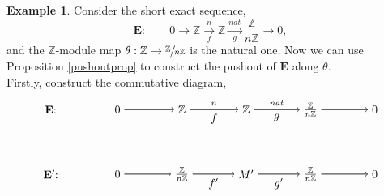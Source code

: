 \documentclass[11.5pt, twoside, a4paper, titlepage]{report}
\providecommand{\bb}[1]{\mathbb{#1}}
\theoremstyle{definition}
\newtheorem{eg}[mydef]{Example}
\theoremstyle{plain}
\begin{document}
\begin{eg}
Consider the short exact sequence,
\begin{equation*}
\mathbf{E}: \qquad 0\xrightarrow{} \bb{Z} \xrightarrow[f]{n} \bb{Z}\xrightarrow[g]{nat}\frac{\bb{Z}}{n\bb{Z}} \xrightarrow{} 0,
\end{equation*}
and the $\bb{Z}$-module map $\theta: \bb{Z} \to \sfrac{\bb{Z}}{n\bb{Z}}$ is the natural one. Now we can use Proposition \ref{pushoutprop} to construct the pushout of $\mathbf{E}$ along $\theta$.\\
Firstly, construct the commutative diagram,
\begin{equation*}
\begin{tikzpicture}[->,-latex, auto, main path/.style={->, semithick}, main node/.style={}]
\node	[main node]		(1) at (0,0)		{$\mathbf{E}$: \quad };
\node	[main node]		(2) at (2,0)		{$0$};
\node	[main node]		(3) at (4,0)		{$\bb{Z}$};
\node [main node]		(4) at (6,0)		{$\bb{Z}$};
\node [main node]		(5) at (8,0)		{$\frac{\bb{Z}}{n\bb{Z}}$};
\node	[main node]		(11) at (10,0)	{$0$};

\node	[main node]		(6) at (0,-2)		{$\mathbf{E'}$: \quad};
\node	[main node]		(7) at (2,-2)		{$0$};
\node	[main node]		(8) at (4,-2)		{$\frac{\bb{Z}}{n\bb{Z}}$};
\node [main node]		(9) at (6,-2)		{$M'$};
\node [main node]		(10) at (8,-2)	{$\frac{\bb{Z}}{n\bb{Z}}$};
\node [main node]		(13) at (10,-2)	{$0$};

\draw (2) edge [main path] node [auto] {$$} (3);
\draw (3) edge [main path] node [auto] {$\scriptstyle{n}$} node [auto, swap] {$f$} (4);
\draw (4) edge [main path] node [auto] {$\scriptstyle{nat}$} node [auto, swap] {$g$} (5);
\draw (5) edge [main path] (11);

\draw (7) edge [main path] node [auto] {$$} (8);
\draw (8) edge [main path] node [auto, swap] {$f'$} (9);
\draw (9) edge [main path] node [auto, swap] {$g'$} (10);
\draw (10) edge [main path] (13);


\end{tikzpicture}
\end{equation*}
\end{eg}
\end{document}
